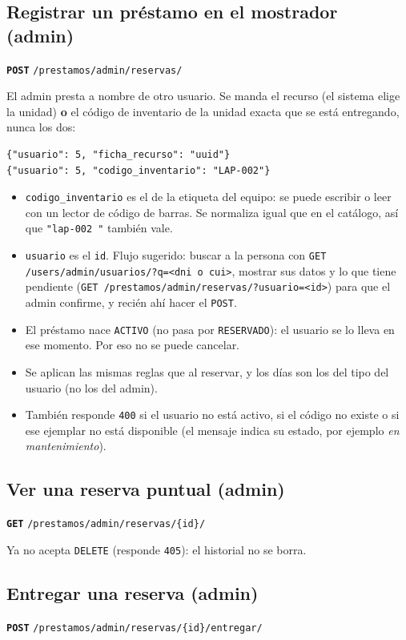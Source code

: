 \documentclass[11pt]{article}
\newcommand{\us}{\_\allowbreak}
\newcommand{\metodo}[2]{\textbf{\texttt{#1}} \texttt{#2}}
\begin{document}
\subsection*{Registrar un pr\'estamo en el mostrador (admin)}
\metodo{POST}{/prestamos/admin/reservas/}

El admin presta a nombre de otro usuario. Se manda el recurso (el sistema elige la unidad) \textbf{o} el c\'odigo de inventario de la unidad exacta que se est\'a entregando, nunca los dos:
\begin{lstlisting}
{"usuario": 5, "ficha_recurso": "uuid"}
{"usuario": 5, "codigo_inventario": "LAP-002"}
\end{lstlisting}
\begin{itemize}
    \item \texttt{codigo\us inventario} es el de la etiqueta del equipo: se puede escribir o leer con un lector de c\'odigo de barras. Se normaliza igual que en el cat\'alogo, as\'i que \texttt{"lap-002 "} tambi\'en vale.
    \item \texttt{usuario} es el \texttt{id}. Flujo sugerido: buscar a la persona con \texttt{GET /users/admin/usuarios/?q=<dni o cui>}, mostrar sus datos y lo que tiene pendiente (\texttt{GET /prestamos/admin/reservas/?usuario=<id>}) para que el admin confirme, y reci\'en ah\'i hacer el \texttt{POST}.
    \item El pr\'estamo nace \texttt{ACTIVO} (no pasa por \texttt{RESERVADO}): el usuario se lo lleva en ese momento. Por eso no se puede cancelar.
    \item Se aplican las mismas reglas que al reservar, y los d\'ias son los del tipo del usuario (no los del admin).
    \item Tambi\'en responde \texttt{400} si el usuario no est\'a activo, si el c\'odigo no existe o si ese ejemplar no est\'a disponible (el mensaje indica su estado, por ejemplo \textit{en mantenimiento}).
\end{itemize}

\subsection*{Ver una reserva puntual (admin)}
\metodo{GET}{/prestamos/admin/reservas/\{id\}/}

Ya no acepta \texttt{DELETE} (responde \texttt{405}): el historial no se borra.

\subsection*{Entregar una reserva (admin)}
\metodo{POST}{/prestamos/admin/reservas/\{id\}/entregar/}
\end{document}
